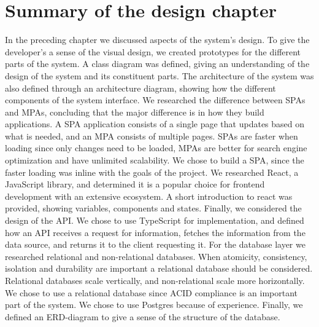 \section{Summary of the design chapter}
In the preceding chapter we discussed aspects of the system's design.
To give the developer's a sense of the visual design, we created prototypes for the different parts of the system.
A class diagram was defined, giving an understanding of the design of the system and its constituent parts.
The architecture of the system was also defined through an architecture diagram, showing how the different components of the system interface.
We researched the difference between SPAs and MPAs, concluding that the major difference is in how they build applications.
A SPA application consists of a single page that updates based on what is needed, and an MPA consists of multiple pages.
SPAs are faster when loading since only changes need to be loaded, MPAs are better for search engine optimization and have unlimited scalability.
We chose to build a SPA, since the faster loading was inline with the goals of the project. 
We researched React, a JavaScript library, and determined it is a popular choice for frontend development with an extensive ecosystem.
A short introduction to react was provided, showing variables, components and states.
Finally, we considered the design of the API.
We chose to use TypeScript for implementation, and defined how an API receives a request for information, fetches the information from the data source, and returns it to the client requesting it.
For the database layer we researched relational and non-relational databases.
When atomicity, consistency, isolation and durability are important a relational database should be considered.
Relational databases scale vertically, and non-relational scale more horizontally.
We chose to use a relational database since ACID compliance is an important part of the system.
We chose to use Postgres because of experience.
Finally, we defined an ERD-diagram to give a sense of the structure of the database.